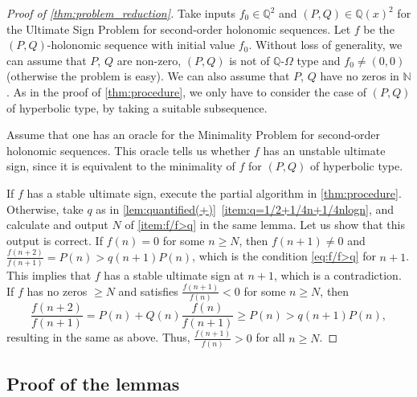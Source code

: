 \documentclass[a4paper,UKenglish,cleveref,autoref,thm-restate]{lipics-v2021}
\newcommand{\N}{\mathbb{N}}
\newcommand{\Q}{\mathbb{Q}}
\begin{document}
\begin{proof}[Proof of \cref{thm:problem_reduction}]
    Take inputs $f_0 \in \Q^2$ and $(P, Q) \in \Q(x)^2$ for the Ultimate Sign Problem for second-order holonomic sequences. Let $f$ be the $(P, Q)$-holonomic sequence with initial value $f_0$. Without loss of generality, we can assume that $P$, $Q$ are non-zero, $(P, Q)$ is not of $\Q$-$\Omega$ type and $f_0 \neq (0, 0)$ (otherwise the problem is easy). 
    We can also assume that $P$, $Q$ have no zeros in $\N$.
    As in the proof of \cref{thm:procedure}, we only have to consider the case of $(P, Q)$ of hyperbolic type, by taking a suitable subsequence. 

    Assume that one has an oracle for the Minimality Problem for second-order holonomic sequences. This oracle tells us whether $f$ has an unstable ultimate sign, since it is equivalent to the minimality of $f$ for $(P, Q)$ of hyperbolic type. 
    
    If $f$ has a stable ultimate sign, execute the partial algorithm in \cref{thm:procedure}. Otherwise, take $q$ as in \cref{lem:quantified(+)}~\eqref{item:q=1/2+1/4n+1/4nlogn}, and calculate and output $N$ of \eqref{item:f/f>q} in the same lemma. Let us show that this output is correct. If $f(n) = 0$ for some $n \geq N$, then $f(n+1) \neq 0$ and $\frac{f(n+2)}{f(n+1)} = P(n) > q(n+1) P(n)$, which is the condition \eqref{eq:f/f>q} for $n+1$. This implies that $f$ has a stable ultimate sign at $n+1$, which is a contradiction. If $f$ has no zeros $\geq N$ and satisfies $\frac{f(n+1)}{f(n)} < 0$ for some $n \geq N$, then 
    \begin{equation} \label{eq:f/f>q_holds}
        \frac{f(n+2)}{f(n+1)} = P(n) + Q(n) \frac{f(n)}{f(n+1)}  
        \geq
        P(n)
        >
        q(n+1) P(n),
    \end{equation}
    resulting in the same as above. Thus, $\frac{f(n+1)}{f(n)} > 0$ for all $n \geq N$. 
\end{proof}























\subsection{Proof of the lemmas} \label{sec:proof_of_lemmas}
\end{document}
